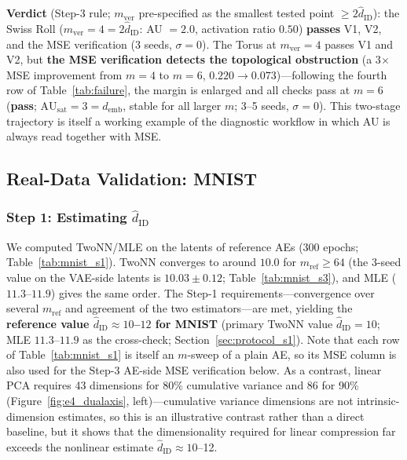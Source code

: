 \documentclass[make,article,submit,pdftex,moreauthors]{Definitions/mdpi}
\newcommand{\hatdID}{\hat{d}_{\mathrm{ID}}}
\newcommand{\AUsat}{\mathrm{AU}_{\mathrm{sat}}}
\newcommand{\demb}{d_{\mathrm{emb}}}
\begin{document}
\textbf{Verdict} (Step-3 rule; $m_{\mathrm{ver}}$ pre-specified as the
smallest tested point $\geq 2\hatdID$): the Swiss Roll
($m_{\mathrm{ver}} = 4 = 2\hatdID$: AU $= 2.0$, activation ratio $0.50$)
\textbf{passes} V1, V2, and the MSE verification (3 seeds, $\sigma = 0$).
The Torus at $m_{\mathrm{ver}} = 4$ passes V1 and V2, but \textbf{the MSE
verification detects the topological obstruction} (a 3$\times$ MSE
improvement from $m = 4$ to $m = 6$, $0.220 \to 0.073$)---following the
fourth row of Table~\ref{tab:failure}, the margin is enlarged and all
checks pass at $m = 6$ (\textbf{pass}; $\AUsat = 3 = \demb$, stable for
all larger $m$; 3--5 seeds, $\sigma = 0$).
This two-stage trajectory is itself a working example of the diagnostic
workflow in which AU is always read together with MSE.

\subsection{Real-Data Validation: MNIST}\label{sec:exp_mnist}

\subsubsection{Step 1: Estimating $\hatdID$}

We computed TwoNN/MLE on the latents of reference AEs (300 epochs;
Table~\ref{tab:mnist_s1}).
TwoNN converges to around $10.0$ for $m_{\mathrm{ref}} \geq 64$
(the 3-seed value on the VAE-side latents is $10.03 \pm 0.12$;
Table~\ref{tab:mnist_s3}), and MLE
($11.3$--$11.9$) gives the same order.
The Step-1 requirements---convergence over several $m_{\mathrm{ref}}$ and
agreement of the two estimators---are met, yielding the
\textbf{reference value $\hatdID \approx 10$--$12$ for MNIST}
(primary TwoNN value $\hatdID = 10$; MLE $11.3$--$11.9$ as the
cross-check; Section~\ref{sec:protocol_s1}).
Note that each row of Table~\ref{tab:mnist_s1} is itself an $m$-sweep of a
plain AE, so its MSE column is also used for the Step-3 AE-side MSE
verification below.
As a contrast, linear PCA requires 43 dimensions for 80\% cumulative
variance and 86 for 90\% (Figure~\ref{fig:e4_dualaxis}, left)---cumulative
variance dimensions are not intrinsic-dimension estimates, so this is an
illustrative contrast rather than a direct baseline, but it shows that the
dimensionality required for linear compression far exceeds the nonlinear
estimate $\hatdID \approx 10$--12.
\end{document}
